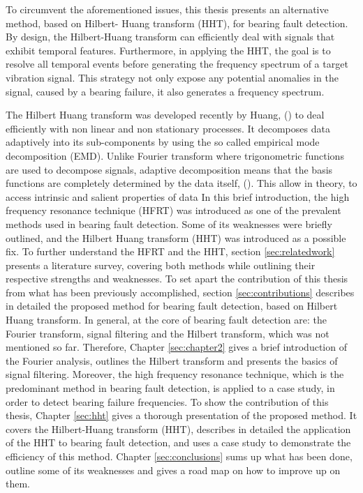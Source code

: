 \documentclass[../Main/thesis.tex]{subfiles}
\begin{document}
To circumvent the aforementioned issues, this thesis presents an alternative method, based on Hilbert- Huang transform (HHT), for bearing fault detection. By design, the Hilbert-Huang transform can efficiently deal with signals that exhibit temporal features. Furthermore, in applying the HHT, the goal is to resolve all temporal events before generating the frequency spectrum of a target vibration signal. This strategy not only expose any potential anomalies in the signal, caused by a bearing failure, it also generates a   frequency spectrum.


\justify
The Hilbert Huang transform was developed recently by  Huang, (\cite{huang98}) to deal efficiently with non linear and non stationary processes. It decomposes data adaptively 
into its sub-components by using the so called empirical mode decomposition (EMD). Unlike Fourier transform where trigonometric functions are used to decompose signals, adaptive decomposition means that 
the basis functions are completely determined by the data itself, (\cite{huang08}). This allow in theory, to access intrinsic and salient properties of data
\justify
In this brief introduction, the high frequency resonance technique (HFRT) was introduced as one of the prevalent methods used in bearing fault detection. Some of its weaknesses were  briefly outlined, and the Hilbert Huang transform (HHT) was introduced as a possible fix. To further understand the HFRT and the HHT, section \ref{sec:relatedwork} presents a literature survey, covering both methods while outlining their respective strengths and weaknesses.
To set apart the contribution of this thesis from what has been previously accomplished, section \ref{sec:contributions} describes in detailed the proposed method for bearing fault detection, based on Hilbert Huang transform.
\justify
In general, at the core of bearing fault detection are: the Fourier transform, signal filtering and the Hilbert transform, which was not mentioned so far. Therefore,
 Chapter \ref{sec:chapter2} gives a brief introduction of the Fourier analysis, outlines the Hilbert transform and presents the basics of signal filtering. Moreover, the high frequency resonance technique, which is the predominant method in bearing fault detection, is applied to a case study, in order to detect bearing failure frequencies. To show the contribution of this thesis, Chapter \ref{sec:hht}
gives a thorough presentation of the proposed method. It covers the Hilbert-Huang transform (HHT), describes in detailed the application of the HHT to bearing fault detection, and uses a case study to demonstrate the efficiency of this method. 
 Chapter \ref{sec:conclusions} sums up what has been done, outline some of its weaknesses and gives a road map on how to improve up on them.
\clearpage
\end{document}

